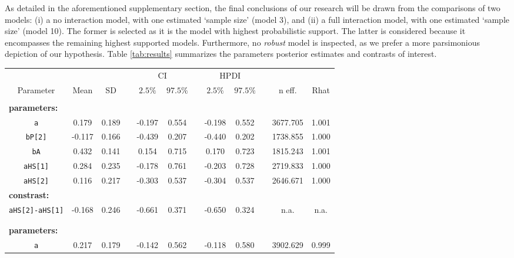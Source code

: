 As detailed in the aforementioned supplementary section, the final conclusions of our research will be drawn from the comparisons of two models: (i) a no interaction model, with one estimated `sample size' (model 3), and (ii) a full interaction model, with one estimated `sample size' (model 10). The former is selected as it is the model with highest probabilistic support. The latter is considered because it encompasses the remaining highest supported models. Furthermore, no \textit{robust} model is inspected, as we prefer a more parsimonious depiction of our hypothesis. Table \ref{tab:results} summarizes the parameters posterior estimates and contrasts of interest.
%
\begin{table}[h!]
	\centering
	\begin{tabular}{|cccccccccccc|} 
		\hline
		& \multicolumn{3}{c}{} & \multicolumn{2}{c}{CI} & & \multicolumn{2}{c}{HPDI} & & \multicolumn{2}{c|}{}\\[0.5ex]
		\cline{5-6} \cline{8-9}
		Parameter & Mean & SD & & $2.5\%$ & $97.5\%$ & & $2.5\%$ & $97.5\%$ & & n eff. & Rhat \\[0.5ex] 
		\hline\hline
		\rowcolor{gray}
		\multicolumn{12}{|l|}{ \textbf{Model 3: No interaction (one `size')} } \\
		\multicolumn{12}{|l|}{ \textbf{parameters:} } \\
		\texttt{a} & 0.179 & 0.189 & & -0.197 & 0.554 & & -0.198 & 0.552 & & 3677.705 & 1.001\\
		\texttt{bP[2]} & -0.117 & 0.166 & & -0.439 & 0.207 & & -0.440 & 0.202 & & 1738.855 & 1.000 \\
		\texttt{bA} & 0.432 & 0.141 & & 0.154 & 0.715 & & 0.170 & 0.723 & & 1815.243 & 1.001 \\
		\texttt{aHS[1]} & 0.284 & 0.235 & & -0.178 & 0.761 & & -0.203 & 0.728 & & 2719.833 & 1.000 \\
		\texttt{aHS[2]} & 0.116 & 0.217 & & -0.303 & 0.537 & & -0.304 & 0.537 & & 2646.671 & 1.000 \\
		\multicolumn{12}{|l|}{ \textbf{constrast:} } \\
		\texttt{aHS[2]-aHS[1]} & -0.168 & 0.246 & & -0.661 & 0.371 & & -0.650 & 0.324 & & n.a. & n.a. \\
		\multicolumn{12}{|l|}{ } \\
		\rowcolor{gray}
		\multicolumn{12}{|l|}{ \textbf{Model 10: Full interaction (one `size')} } \\
		\multicolumn{12}{|l|}{ \textbf{parameters:} } \\
		\texttt{a} & 0.217 & 0.179 & & -0.142 & 0.562 & & -0.118 & 0.580 & & 3902.629 & 0.999 \\

\end{tabular}
\end{table}
